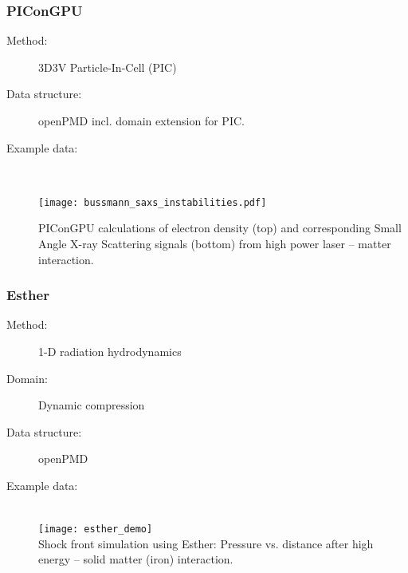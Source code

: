 \documentclass[12pt]{scrartcl}
\begin{document}
\subsubsection{PIConGPU\label{sec:interface_pmi_picongpu}}
\begin{description}
  \item[Method:] 3D3V Particle-In-Cell (PIC)
  \item[Data structure:] openPMD incl. domain extension for PIC.
  \item[Example data:]\ \\
      \begin{center}
        \texttt{[image: bussmann\_saxs\_instabilities.pdf]}
      \end{center}
      \scriptsize{PIConGPU calculations of electron density (top) and
        corresponding Small Angle X-ray Scattering signals (bottom) from high power laser -- matter
    interaction.}
\end{description}
%
\subsubsection{Esther\label{sec:interface_pmi_esther}}
\begin{description}
  \item[Method:] 1-D radiation hydrodynamics
  \item[Domain:] Dynamic compression
  \item[Data structure:] openPMD
  \item[Example data:] \ \\
    \texttt{[image: esther\_demo]}\\
    \scriptsize{Shock front simulation using Esther: Pressure vs. distance after
    high energy -- solid matter (iron) interaction.}
\end{description}

\end{document}
